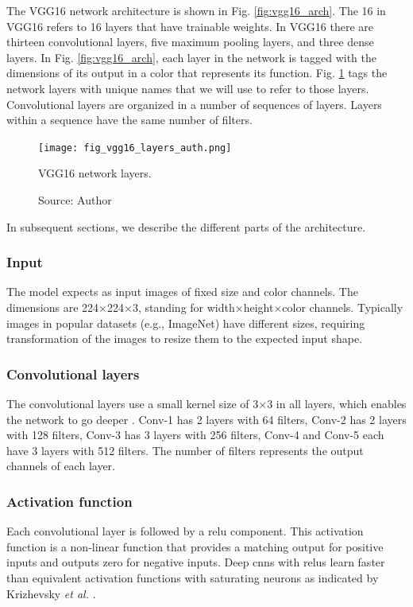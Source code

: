 The VGG16 network architecture is shown in Fig. \ref{fig:vgg16_arch}. The 16 in VGG16 refers to 16 layers that have trainable weights. In VGG16 there are thirteen convolutional layers, five maximum pooling layers, and three dense layers. In Fig. \ref{fig:vgg16_arch}, each layer in the network is tagged with the dimensions of its output in a color that represents its function. Fig. \ref{fig:vgg16_layers_auth} tags the network layers with unique names that we will use to refer to those layers. Convolutional layers are organized in a number of sequences of layers. Layers within a sequence have the same number of filters.
\begin{figure}[ht]
    \begin{center}       
    \texttt{[image: fig\_vgg16\_layers\_auth.png]}
    \caption[VGG16 network layers]{VGG16 network layers.}
    \caption*{Source: Author}
    \label{fig:vgg16_layers_auth}
    \end{center}
\end{figure}

In subsequent sections, we describe the different parts of the architecture.
\subsubsection{Input}
The model expects as input images of fixed size and color channels. The dimensions are 224$\times$224$\times$3, standing for width$\times$height$\times$color channels. Typically images in popular datasets (e.g., ImageNet) have different sizes, requiring transformation of the images to resize them to the expected input shape.

\subsubsection{Convolutional layers}
The convolutional layers use a small kernel size of 3$\times$3 in all layers, which enables the network to go deeper \cite{simonyan2014very}. Conv-1 has 2 layers with 64 filters, Conv-2 has 2 layers with 128 filters, Conv-3 has 3 layers with 256 filters, Conv-4 and Conv-5 each have 3 layers with 512 filters. The number of filters represents the output channels of each layer.

\subsubsection{Activation function}
Each convolutional layer is followed by a \acrfull{relu} component. This activation function is a non-linear function that provides a matching output for positive inputs and outputs zero for negative inputs. Deep \acrshort{cnn}s with \acrshort{relu}s learn faster than equivalent activation functions with saturating neurons as indicated by Krizhevsky \textit{et al.} \cite{krizhevsky2017imagenet}.

